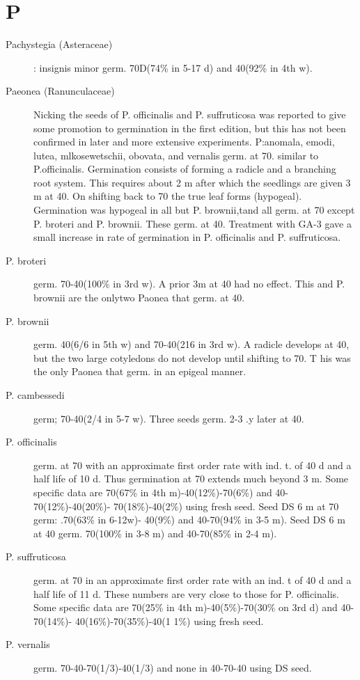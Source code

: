 \section{P}
\begin{description}

\item[Pachystegia (Asteraceae)] : insignis minor germ. 70D(74\% in 5-17 d)
and 40(92\% in 4th w).
\item[Paeonea (Ranunculaceae)] Nicking the seeds of P. officinalis and P.
suffruticosa was reported to give some promotion to germination in the first edition, but
this has not been confirmed in later and more extensive experiments. P:anomala,
emodi, lutea, mlkosewetschii, obovata, and vernalis germ. at 70. similar to P.officinalis.
Germination consists of forming a radicle and a branching root system. This requires
about 2 m after which the seedlings are given 3 m at 40. On shifting back to 70 the
true leaf forms (hypogeal). Germination was hypogeal in all but P. brownii,tand all
germ. at 70 except P. broteri and P. brownii. These germ. at 40. Treatment with GA-3
gave a small increase in rate of germination in P. officinalis and P. suffruticosa.
\item[P. broteri] germ. 70-40(100\% in 3rd w). A prior 3m at 40 had no effect. This and
P. brownii are the onlytwo Paonea that germ. at 40.

\item[P. brownii] germ. 40(6/6 in 5th w) and 70-40(216 in 3rd w). A radicle develops at
40, but the two large cotyledons do not develop until shifting to 70. T his was the only
Paonea that germ. in an epigeal manner.
\item[P. cambessedi] germ; 70-40(2/4 in 5-7 w). Three seeds germ. 2-3 .y later at 40.
\item[P. officinalis] germ. at 70 with an approximate first order rate with ind. t. of 40 d
and a half life of 10 d. Thus germination at 70 extends much beyond 3 m. Some
specific data are 70(67\% in 4th m)-40(12\%)-70(6\%) and 40-70(12\%)-40(20\%)-
70(18\%)-40(2\%) using fresh seed. Seed DS 6 m at 70 germ: .70(63\% in 6-12w)-
40(9\%) and 40-70(94\% in 3-5 m). Seed DS 6 m at 40 germ. 70(100\% in 3-8 m) and
40-70(85\% in 2-4 m).
\item[P. suffruticosa] germ. at 70 in an approximate first order rate with an ind. t of 40 d
and a half life of 11 d. These numbers are very close to those for P. officinalis. Some
specific data are 70(25\% in 4th m)-40(5\%)-70(30\% on 3rd d) and 40-70(14\%)-
40(16\%)-70(35\%)-40(1 1\%) using fresh seed.
\item[P. vernalis] germ. 70-40-70(1/3)-40(1/3) and none in 40-70-40 using DS seed.


\end{description}
